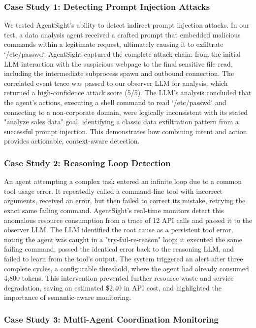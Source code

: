 \subsubsection{Case Study 1: Detecting Prompt Injection Attacks}

We tested AgentSight's ability to detect indirect prompt injection attacks\cite{indirect-prompt-inject}. In our test, a data analysis agent received a crafted prompt that embedded malicious commands within a legitimate request, ultimately causing it to exfiltrate `/etc/passwd`. AgentSight captured the complete attack chain: from the initial LLM interaction with the suspicious webpage to the final sensitive file read, including the intermediate subprocess spawn and outbound connection. The correlated event trace was passed to our observer LLM for analysis, which returned a high-confidence attack score (5/5). The LLM's analysis concluded that the agent's actions, executing a shell command to read `/etc/passwd` and connecting to a non-corporate domain, were logically inconsistent with its stated "analyze sales data" goal, identifying a classic data exfiltration pattern from a successful prompt injection. This demonstrates how combining intent and action provides actionable, context-aware detection.

\subsubsection{Case Study 2: Reasoning Loop Detection}

An agent attempting a complex task entered an infinite loop due to a common tool usage error. It repeatedly called a command-line tool with incorrect arguments, received an error, but then failed to correct its mistake, retrying the exact same failing command. AgentSight's real-time monitors detect this anomalous resource consumption from a trace of 12 API calls and passed it to the observer LLM. The LLM identified the root cause as a persistent tool error, noting the agent was caught in a "try-fail-re-reason" loop; it executed the same failing command, passed the identical error back to the reasoning LLM, and failed to learn from the tool's output. The system triggered an alert after three complete cycles, a configurable threshold, where the agent had already consumed 4,800 tokens. This intervention prevented further resource waste and service degradation, saving an estimated \$2.40 in API cost, and highlighted the importance of semantic-aware monitoring.

\subsubsection{Case Study 3: Multi-Agent Coordination Monitoring}

